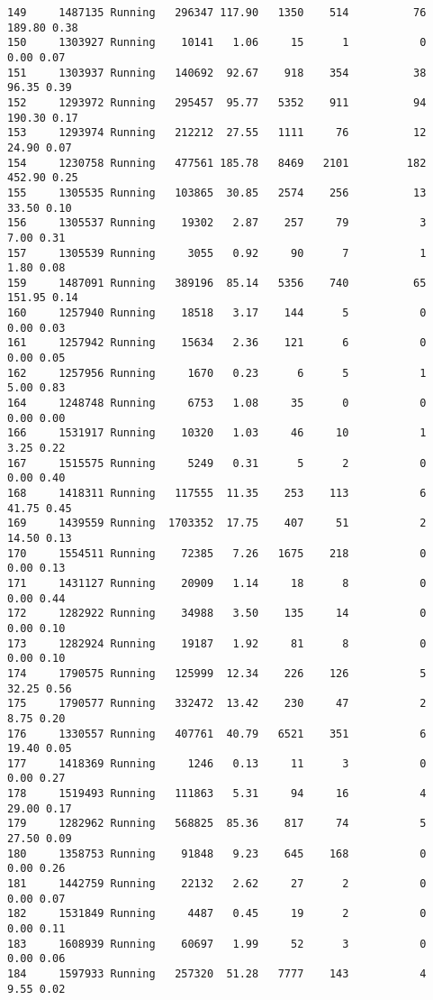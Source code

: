 \documentclass[
]{article}
\begin{document}
\begin{verbatim}
149     1487135 Running   296347 117.90   1350    514          76  189.80 0.38
150     1303927 Running    10141   1.06     15      1           0    0.00 0.07
151     1303937 Running   140692  92.67    918    354          38   96.35 0.39
152     1293972 Running   295457  95.77   5352    911          94  190.30 0.17
153     1293974 Running   212212  27.55   1111     76          12   24.90 0.07
154     1230758 Running   477561 185.78   8469   2101         182  452.90 0.25
155     1305535 Running   103865  30.85   2574    256          13   33.50 0.10
156     1305537 Running    19302   2.87    257     79           3    7.00 0.31
157     1305539 Running     3055   0.92     90      7           1    1.80 0.08
159     1487091 Running   389196  85.14   5356    740          65  151.95 0.14
160     1257940 Running    18518   3.17    144      5           0    0.00 0.03
161     1257942 Running    15634   2.36    121      6           0    0.00 0.05
162     1257956 Running     1670   0.23      6      5           1    5.00 0.83
164     1248748 Running     6753   1.08     35      0           0    0.00 0.00
166     1531917 Running    10320   1.03     46     10           1    3.25 0.22
167     1515575 Running     5249   0.31      5      2           0    0.00 0.40
168     1418311 Running   117555  11.35    253    113           6   41.75 0.45
169     1439559 Running  1703352  17.75    407     51           2   14.50 0.13
170     1554511 Running    72385   7.26   1675    218           0    0.00 0.13
171     1431127 Running    20909   1.14     18      8           0    0.00 0.44
172     1282922 Running    34988   3.50    135     14           0    0.00 0.10
173     1282924 Running    19187   1.92     81      8           0    0.00 0.10
174     1790575 Running   125999  12.34    226    126           5   32.25 0.56
175     1790577 Running   332472  13.42    230     47           2    8.75 0.20
176     1330557 Running   407761  40.79   6521    351           6   19.40 0.05
177     1418369 Running     1246   0.13     11      3           0    0.00 0.27
178     1519493 Running   111863   5.31     94     16           4   29.00 0.17
179     1282962 Running   568825  85.36    817     74           5   27.50 0.09
180     1358753 Running    91848   9.23    645    168           0    0.00 0.26
181     1442759 Running    22132   2.62     27      2           0    0.00 0.07
182     1531849 Running     4487   0.45     19      2           0    0.00 0.11
183     1608939 Running    60697   1.99     52      3           0    0.00 0.06
184     1597933 Running   257320  51.28   7777    143           4    9.55 0.02

\end{verbatim}
\end{document}
